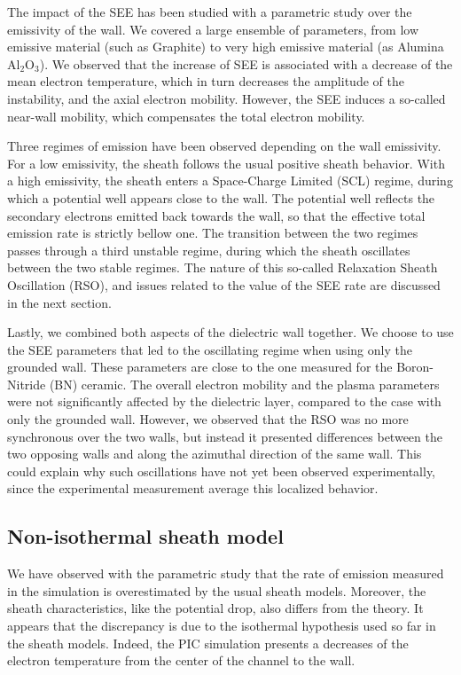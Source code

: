     The impact of the SEE has been studied with a parametric study over the emissivity of the wall.
    We covered a large ensemble of parameters, from low emissive material (such as Graphite) to very high emissive material (as Alumina Al$_2$O$_3$).
    We observed that the increase of SEE is associated with a decrease of the mean electron temperature, which in turn decreases the amplitude of the instability, and the axial electron mobility.
    However, the SEE induces a so-called near-wall mobility, which compensates the total electron mobility.

    Three regimes of emission have been observed depending on the wall emissivity.
    For a low emissivity, the sheath follows the usual positive sheath behavior.
    With a high emissivity, the sheath enters a Space-Charge Limited (SCL) regime, during which a potential well appears close to the wall.
    The potential well reflects the secondary electrons emitted back towards the wall, so that the effective total emission rate is strictly bellow one.
    The transition between the two regimes passes through a third unstable regime, during which the sheath oscillates between the two stable regimes.
    The nature of this so-called Relaxation Sheath Oscillation (RSO), and issues related to the value of the SEE rate are discussed in the next section.

    Lastly, we combined both aspects of the dielectric wall together.
    We choose to use the SEE parameters that led to the oscillating regime when using only the grounded wall.
    These parameters are close to the one measured for the Boron-Nitride (BN) ceramic.
    The overall electron mobility and the plasma parameters were not significantly affected by the dielectric layer, compared to the case with only the grounded wall.
    However, we observed that the RSO was no more synchronous over the two walls, but instead it presented differences between the two opposing walls and along the azimuthal direction of the same wall.
    This could explain why such oscillations have not yet been observed experimentally, since the experimental measurement average this localized behavior.

  \subsection{Non-isothermal sheath model}

    We have observed with the parametric study that the rate of emission measured in the simulation is overestimated by the usual sheath models.
    Moreover, the sheath characteristics, like the potential drop, also differs from the theory.
    It appears that the discrepancy is due to the isothermal hypothesis used so far in the sheath models.
    Indeed, the PIC simulation presents a decreases of the electron temperature from the center of the channel to the wall.

